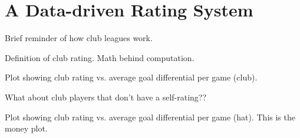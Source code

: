 \section{A Data-driven Rating System}

Brief reminder of how club leagues work.

Definition of club rating.  Math behind computation.

Plot showing club rating vs. average goal differential per game (club).

What about club players that don't have a self-rating??

Plot showing club rating vs. average goal differential per game (hat).  This is the money plot.